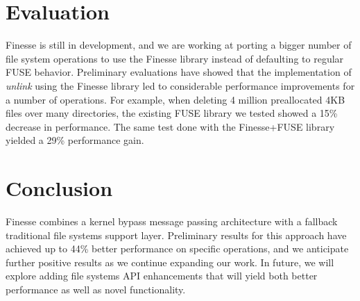 \documentclass[sigplan,10pt,letter,plain]{acmart}
\begin{document}
\section{Evaluation}

Finesse is still in development, and we are working at porting a bigger number of file system operations to use the Finesse library instead of defaulting to regular FUSE behavior. Preliminary evaluations have showed that the implementation of \textit{unlink} using the Finesse library led to considerable performance improvements for a number of operations. For example, when deleting 4 million preallocated 4KB files over many directories, the existing FUSE library we tested showed a 15\% decrease in performance.  The same test done with the Finesse+FUSE library yielded a 29\% performance gain. 


\section{Conclusion}

Finesse combines a kernel bypass message passing architecture with a fallback traditional file systems support layer.  Preliminary results for this approach have achieved up to 44\% better performance on specific operations, and we anticipate further positive results as we continue expanding our work.
In future, we will explore adding file systems API enhancements that will yield both better performance as well as novel functionality.







\end{document}
